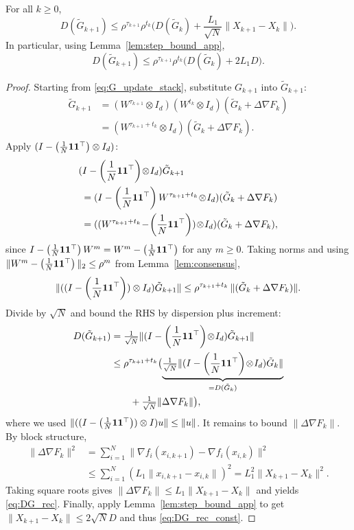\documentclass[review,onefignum,onetabnum]{siamart171218}
\begin{document}
\begin{lemma}\label{lem:DG_rec}
For all $k\ge0$,
\begin{equation}\label{eq:DG_rec}
D(\tilde G_{k+1})
\le \rho^{\tau_{k+1}}\rho^{t_k}\Big(D(\tilde G_k)+\frac{L_1}{\sqrt N}\|X_{k+1}-X_k\|\Big).
\end{equation}
In particular, using Lemma~\ref{lem:step_bound_app},
\begin{equation}\label{eq:DG_rec_const}
D(\tilde G_{k+1})
\le \rho^{\tau_{k+1}}\rho^{t_k}\Big(D(\tilde G_k)+2L_1D\Big).
\end{equation}
\end{lemma}
\begin{proof}
Starting from \eqref{eq:G_update_stack}, substitute $G_{k+1}$ into $\tilde G_{k+1}$:
\begin{align*}
\tilde G_{k+1}
&=(W^{\tau_{k+1}}\!\otimes\! I_d)(W^{t_k}\!\otimes\! I_d)(\tilde G_k\!+\!\Delta\nabla F_k)\\
&=(W^{\tau_{k+1}+t_k}\!\otimes\! I_d)(\tilde G_k\!+\!\Delta\nabla F_k).
\end{align*}
Apply $(I-\left(\frac{1}{N}\mathbf{1}\mathbf{1}^\top\right)\otimes I_d)$:
\begin{align*}
&(\Pmat\!\otimes\! I_d)\tilde G_{k+1}\\
&\;=(\Pmat W^{\tau_{k+1}+t_k}\!\otimes\! I_d)(\tilde G_k+\Delta\nabla F_k)\\
&\;=((W^{\tau_{k+1}+t_k}\!-\!\J)\!\otimes\! I_d)(\tilde G_k+\Delta\nabla F_k),
\end{align*}
since $I-\left(\frac{1}{N}\mathbf{1}\mathbf{1}^\top\right) W^m=W^m-\left(\frac{1}{N}\mathbf{1}\mathbf{1}^\top\right)$ for any $m\ge0$.
Taking norms and using $\|W^{m}-\left(\frac{1}{N}\mathbf{1}\mathbf{1}^\top\right)\|_2\le \rho^{m}$ from Lemma~\ref{lem:consensus},
\[
\|((I-\left(\frac{1}{N}\mathbf{1}\mathbf{1}^\top\right))\otimes I_d)\tilde G_{k+1}\|
\le \rho^{\tau_{k+1}+t_k}\,\|(\tilde G_k+\Delta\nabla F_k)\|.
\]
Divide by $\sqrt N$ and bound the RHS by dispersion plus increment:
\begin{align*}
D(\tilde G_{k+1})
&=\tfrac1{\sqrt N}\|(I-\left(\frac{1}{N}\mathbf{1}\mathbf{1}^\top\right)\!\otimes\! I_d)\tilde G_{k+1}\|\\
&\le \rho^{\tau_{k+1}+t_k}\bigl(
\underbrace{\tfrac1{\sqrt N}\|(I-\left(\frac{1}{N}\mathbf{1}\mathbf{1}^\top\right)\!\otimes\! I_d)\tilde G_k\|}_{=D(\tilde G_k)}\\
&\qquad+\tfrac1{\sqrt N}\|\Delta\nabla F_k\|\bigr),
\end{align*}
where we used $\|((I-\left(\frac{1}{N}\mathbf{1}\mathbf{1}^\top\right))\otimes I)u\|\le \|u\|$.
It remains to bound $\|\Delta\nabla F_k\|$.
By block structure,
\begin{align*}
\|\Delta\nabla F_k\|^2
&=\textstyle\sum_{i=1}^N\|\nabla f_i(x_{i,k+1})\!-\!\nabla f_i(x_{i,k})\|^2\\
&\le \textstyle\sum_{i=1}^N (L_1\|x_{i,k+1}\!-\!x_{i,k}\|)^2
=L_1^2\|X_{k+1}\!-\!X_k\|^2.
\end{align*}
Taking square roots gives $\|\Delta\nabla F_k\|\le L_1\|X_{k+1}-X_k\|$ and yields \eqref{eq:DG_rec}.
Finally, apply Lemma~\ref{lem:step_bound_app} to get $\|X_{k+1}-X_k\|\le 2\sqrt N D$ and thus \eqref{eq:DG_rec_const}.
\end{proof}
\end{document}
